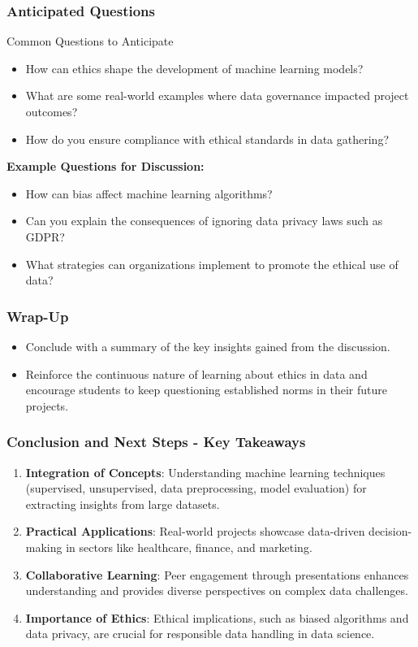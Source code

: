 \documentclass[aspectratio=169]{beamer}
\begin{document}
\begin{frame}[fragile]
  \frametitle{Anticipated Questions}
  \begin{block}{Common Questions to Anticipate}
    \begin{itemize}
      \item How can ethics shape the development of machine learning models?
      \item What are some real-world examples where data governance impacted project outcomes?
      \item How do you ensure compliance with ethical standards in data gathering?
    \end{itemize}
  \end{block}

  \textbf{Example Questions for Discussion:}
  \begin{itemize}
    \item How can bias affect machine learning algorithms?  
    \item Can you explain the consequences of ignoring data privacy laws such as GDPR?
    \item What strategies can organizations implement to promote the ethical use of data?
  \end{itemize}
\end{frame}

\begin{frame}[fragile]
  \frametitle{Wrap-Up}
  \begin{itemize}
    \item Conclude with a summary of the key insights gained from the discussion.
    \item Reinforce the continuous nature of learning about ethics in data and encourage students to keep questioning established norms in their future projects.
  \end{itemize}
\end{frame}

\begin{frame}[fragile]
  \frametitle{Conclusion and Next Steps - Key Takeaways}
  \begin{enumerate}
    \item \textbf{Integration of Concepts}: Understanding machine learning techniques (supervised, unsupervised, data preprocessing, model evaluation) for extracting insights from large datasets.
    
    \item \textbf{Practical Applications}: Real-world projects showcase data-driven decision-making in sectors like healthcare, finance, and marketing.
    
    \item \textbf{Collaborative Learning}: Peer engagement through presentations enhances understanding and provides diverse perspectives on complex data challenges.
    
    \item \textbf{Importance of Ethics}: Ethical implications, such as biased algorithms and data privacy, are crucial for responsible data handling in data science.
  \end{enumerate}
\end{frame}
\end{document}
